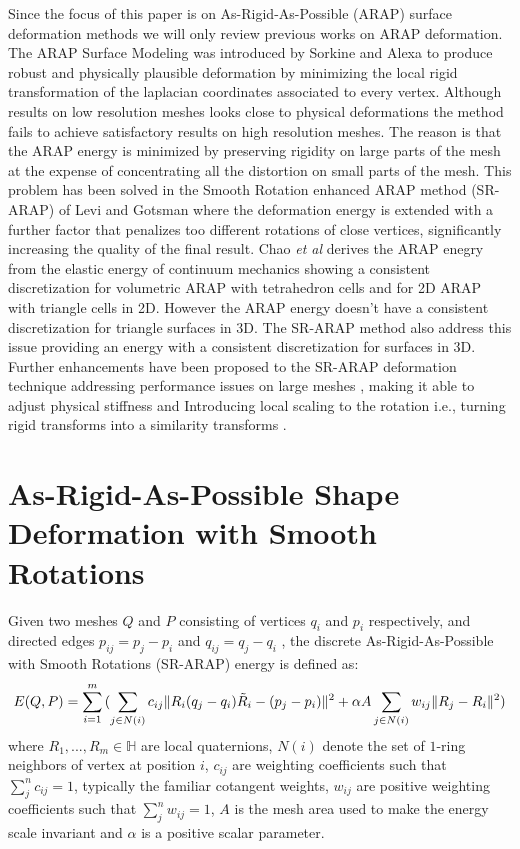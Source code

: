 \documentclass{birkjour}
\numberwithin{equation}{section}
\begin{document}
Since the focus of this paper is on As-Rigid-As-Possible (ARAP) surface deformation methods we will only review previous works on ARAP deformation. The ARAP Surface Modeling was introduced by Sorkine and Alexa \cite{Sorkine2007} to produce robust and physically plausible deformation by minimizing the local rigid transformation of the laplacian coordinates associated to every vertex. Although results on low resolution meshes looks close to physical deformations the method fails to achieve satisfactory results  on high resolution meshes. The reason is that the ARAP energy is minimized by preserving rigidity on large parts of the mesh at the expense of concentrating all the distortion on small parts of the mesh. This problem has been solved in the Smooth Rotation enhanced ARAP method (SR-ARAP) of Levi and Gotsman \cite{Levi2015} where the deformation energy is extended with a further factor that penalizes too different rotations of close vertices, significantly increasing the quality of the final result. Chao \emph{et al} \cite{Chao2010} derives the ARAP enegry from the elastic energy of continuum mechanics showing a consistent discretization for volumetric ARAP with tetrahedron cells and for 2D ARAP with triangle cells in 2D. However the ARAP energy doesn't have a consistent discretization for triangle surfaces in 3D. The SR-ARAP method  \cite{Levi2015} also address this issue providing an energy with a consistent discretization for surfaces in 3D. Further enhancements have been proposed to the SR-ARAP deformation technique addressing performance issues on large meshes \cite{Morsucci2018, Ligare2020}, making it able to adjust physical stiffness \cite{Chen2017, LeVaou2020} and Introducing local scaling to the rotation i.e., turning rigid transforms into a similarity transforms \cite{Jiang2017}.



\section{As-Rigid-As-Possible Shape Deformation with Smooth Rotations}

Given two meshes $Q$ and $P$ consisting of vertices $q_i$ and $p_i$ respectively, and directed edges $p_{ij} = p_j - p_i$ and $q_{ij} = q_j - q_i$ , the discrete As-Rigid-As-Possible with Smooth Rotations (SR-ARAP) energy is defined as:
\begin{equation}
E(Q, P) = \sum_{i=1}^m { (\sum_{j \in N(i)} { c_{ij} \|R_i (q_j - q_i) \tilde R_i - (p_j - p_i)  \|^2 } \nonumber \\
+ \alpha A \sum_{j \in N(i)} {w_{ij} \| R_j - R_i \|^2} )}\nonumber
\end{equation}
where $R_1, ..., R_m \in \mathbb{H}$ are local quaternions, $N(i)$ denote the set of $1$-ring neighbors of vertex at position $i$, $c_{ij}$ are weighting coefficients such that $\sum_j^n{c_{ij}} = 1$, typically the familiar cotangent weights, $w_{ij}$ are positive weighting coefficients such that $\sum_j^n{w_{ij}} = 1$, $A$ is the mesh area used to make the energy scale invariant and $\alpha$ is a positive scalar parameter.
\end{document}
